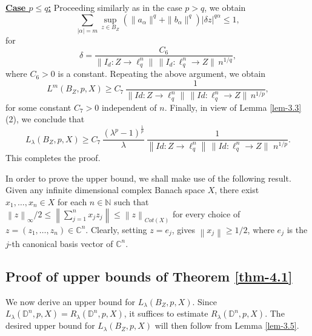 \documentclass[a4paper,11pt, reqno]{amsart}
\theoremstyle{definition}
\newenvironment{customthm}[1]
{\renewcommand\theinnercustomthm{#1}\innercustomthm}
{\endinnercustomthm}
\newcommand{\norm}[1]{\left\lVert#1\right\rVert}
\begin{document}
\medskip

\noindent
\underline{\textbf{Case $p\leq q$:}}
Proceeding similarly as in the case $p>q$, we obtain
\[
\sum_{|\alpha|=m}\sup_{z\in B_Z}\left(\|a_\alpha\|^q+\|b_\alpha\|^q\right)|\delta z|^{q\alpha}\leq 1,
\]
for
\[
\delta=\frac{C_6}{\|I_d: Z\to \ell_q^n\|\,\|I_d:\ell_q^n\to Z\|\,n^{1/q}},
\]
where $C_6>0$ is a constant. Repeating the above argument, we obtain
\[
L^m(B_Z,p,X)\geq C_7\,
\frac{1}{\|Id: Z\to \ell_q^n\|\,\|Id:\ell_q^n\to Z\|\,n^{1/p}},
\]
for some constant $C_7>0$ independent of $n$. 
Finally, in view of Lemma \ref{lem-3.3} (2), we conclude that
\begin{equation*}
	L_{\lambda}(B_{Z}, p,X) \geq C_7\, \dfrac{\left(\lambda^p -1\right)^{\frac{1}{p}}}{\lambda}\,   \frac{1}{ \norm{Id: Z \rightarrow \ell^n_q}\,\|Id:\ell_q^n\to Z\|\, \, n^{1/p}}.
\end{equation*}
This completes the proof.

\medskip
In order to prove the upper bound, we shall make use of the following result.
\begin{customthm}{A} \cite[Theorem 14.5]{diestel-abs-summing-1995} \label{thm-A}
	Given any infinite dimensional complex Banach space $X$, there exist $x_{1}, \ldots , x_{n} \in X$ for each $n \in \mathbb{N}$ such that $\norm{z}_{\infty}/2 \leq \norm{\sum_{j=1}^{n} x_{j}z_{j}} \leq \norm{z}_{Cot(X)}$  for every choice of $z=(z_{1}, \ldots,z_{n}) \in \mathbb{C}^n$. Clearly, setting $z=e_{j}$, gives $\norm{x_{j}}\geq 1/2$, where $e_{j}$ is the $j$-th canonical basis vector of $\mathbb{C}^n$.
\end{customthm}
\subsection{Proof of upper bounds of Theorem \ref{thm-4.1}}
We now derive an upper bound for $L_{\lambda}(B_{Z}, p,X)$. Since $L_{\lambda}(\mathbb{D}^n, p,X)=R_{\lambda}(\mathbb{D}^n, p,X)$, it suffices to estimate $R_{\lambda}(\mathbb{D}^n, p,X)$. The desired upper bound for $L_{\lambda}(B_Z, p,X)$ will then follow from Lemma \ref{lem-3.5}. 
\end{document}
